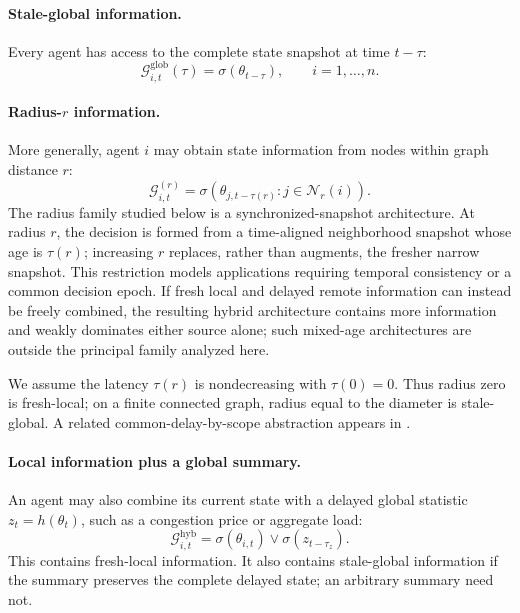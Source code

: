 \documentclass[11pt]{article}
\begin{document}
\paragraph{Stale-global information.}
Every agent has access to the complete state snapshot at time $t-\tau$:
\begin{equation}
    \mathcal{G}_{i,t}^{\mathrm{glob}}(\tau)
    =
    \sigma\!\left(
        \theta_{t-\tau}
    \right),
    \qquad i=1,\ldots,n.
    \label{eq:stale_global_arch}
\end{equation}

\paragraph{Radius-$r$ information.}
More generally, agent $i$ may obtain state information from nodes within graph
distance $r$:
\begin{equation}
    \mathcal{G}_{i,t}^{(r)}
    =
    \sigma\!\left(
        \theta_{j,t-\tau(r)}:
        j\in\mathcal{N}_r(i)
    \right).
    \label{eq:radius_arch}
\end{equation}
The radius family studied below is a synchronized-snapshot architecture. At
radius $r$, the decision is formed from a time-aligned neighborhood snapshot
whose age is $\tau(r)$; increasing $r$ replaces, rather than augments, the
fresher narrow snapshot. This restriction models applications requiring temporal
consistency or a common decision epoch. If fresh local and delayed remote
information can instead be freely combined, the resulting hybrid architecture
contains more information and weakly dominates either source alone; such
mixed-age architectures are outside the principal family analyzed here.

We assume the latency $\tau(r)$ is nondecreasing with $\tau(0)=0$.
Thus radius zero is fresh-local; on a finite connected graph, radius equal to
the diameter is stale-global. A related common-delay-by-scope abstraction
appears in \cite{ballotta2023latency}.

\paragraph{Local information plus a global summary.}
An agent may also combine its current state with a delayed global statistic
$z_t=h(\theta_t)$, such as a congestion price or aggregate load:
\begin{equation}
\mathcal G_{i,t}^{\mathrm{hyb}}=\sigma(\theta_{i,t})\vee\sigma(z_{t-\tau_z}).
\label{eq:hybrid_arch}
\end{equation}
This contains fresh-local information. It also contains stale-global information
if the summary preserves the complete delayed state; an arbitrary summary need not.
\end{document}
